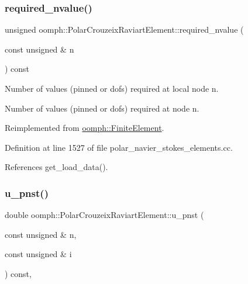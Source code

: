 \subsubsection{\texorpdfstring{required\+\_\+nvalue()}{required\_nvalue()}}
{\footnotesize\ttfamily unsigned oomph\+::\+Polar\+Crouzeix\+Raviart\+Element\+::required\+\_\+nvalue (\begin{DoxyParamCaption}\item[{const unsigned \&}]{n }\end{DoxyParamCaption}) const\hspace{0.3cm}{\ttfamily [virtual]}}



Number of values (pinned or dofs) required at local node n. 

Number of values (pinned or dofs) required at node n. 

Reimplemented from \hyperlink{classoomph_1_1FiniteElement_a56610c60d5bc2d7c27407a1455471b1a}{oomph\+::\+Finite\+Element}.



Definition at line 1527 of file polar\+\_\+navier\+\_\+stokes\+\_\+elements.\+cc.



References get\+\_\+load\+\_\+data().

\mbox{\label{classoomph_1_1PolarCrouzeixRaviartElement_a9c214952496bbb3e777e7c49d4579377}} 
\subsubsection{\texorpdfstring{u\+\_\+pnst()}{u\_pnst()}\hspace{0.1cm}{\footnotesize\ttfamily [1/2]}}
{\footnotesize\ttfamily double oomph\+::\+Polar\+Crouzeix\+Raviart\+Element\+::u\+\_\+pnst (\begin{DoxyParamCaption}\item[{const unsigned \&}]{n,  }\item[{const unsigned \&}]{i }\end{DoxyParamCaption}) const\hspace{0.3cm}{\ttfamily [inline]}, {\ttfamily [virtual]}}




